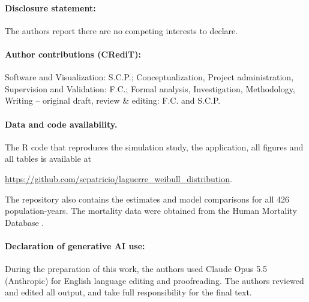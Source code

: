 \documentclass[12pt]{article}
\begin{document}
\paragraph*{Disclosure statement:}
The authors report there are no competing interests to declare.

\paragraph*{Author contributions (CRediT):}
Software and Visualization: S.C.P.; Conceptualization, Project administration, Supervision and Validation: F.C.; Formal analysis, Investigation, Methodology, Writing -- original draft, review \& editing: F.C. and S.C.P.

\paragraph*{Data and code availability.}
The {\sf R} code that reproduces the simulation study, the application, all figures and all tables is available at 
\begin{center}
    \url{https://github.com/scpatricio/laguerre_weibull_distribution}.
\end{center}
The repository also contains the estimates and model comparisons for all 426 population-years. The mortality data were obtained from the Human Mortality Database \citep{hmd}.

\paragraph*{Declaration of generative AI use:}
During the preparation of this work, the authors used Claude Opus 5.5 (Anthropic) for English language editing and proofreading. The authors reviewed and edited all output, and take full responsibility for the final text.





\newpage


\end{document}
